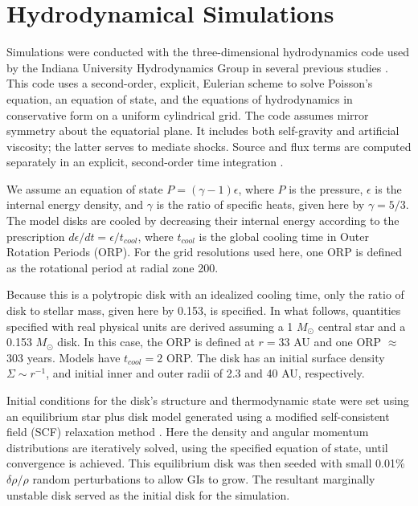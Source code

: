 \documentclass[manuscript]{aastex}
\begin{document}
\section{Hydrodynamical Simulations}

Simulations were conducted with the three-dimensional hydrodynamics code used by the Indiana University Hydrodynamics Group in several previous studies \citep{pickett1998, pickett2000, mejiaphd2004, mejia2005, boley2006, cai2008}.  This code uses a second-order, explicit, Eulerian scheme to solve Poisson's equation, an equation of state, and the equations of hydrodynamics in conservative form on a uniform cylindrical grid.  The code assumes mirror symmetry about the equatorial plane. It includes both self-gravity and artificial viscosity; the latter serves to 
mediate shocks. Source and flux terms \citep{norman1986} are computed separately in an explicit, second-order time integration \citep{albada1982,christodoulou1991,yangphd1992}.

We assume an equation of state $P = (\gamma -1)\epsilon$, where $P$ is the pressure, $\epsilon$ is the internal energy density, and $\gamma$ is the ratio of specific heats, given here by $\gamma = 5/3$.  The model disks are cooled by decreasing their internal energy according to the prescription $d\epsilon/dt = \epsilon / t_{cool}$, where $t_{cool}$ is the global cooling time in Outer Rotation Periods (ORP).  For the grid resolutions used here, one ORP is defined as the rotational period at radial zone 200.


Because this is a polytropic disk with an idealized cooling time, only the ratio of disk to stellar mass, given here by 0.153, is specified.  In what follows, quantities specified with real physical units are derived assuming a 1 $M_\odot$ central star and a 0.153  $M_\odot$ disk. In this case, the ORP is defined at $r = 33$ AU and one ORP $\approx$ 303 years.  Models have $t_{cool} = 2$ ORP. The disk has an initial surface density $\Sigma \sim r^{ -1}$, and initial inner and outer radii of 2.3 and 40 AU, respectively.  

Initial conditions for the disk's structure and thermodynamic state were set using an equilibrium star plus disk model generated using a modified \citet{hachisu1986} self-consistent field (SCF) relaxation method \citep{pickett1996,pickett2003,mejiaphd2004,mejia2005,cai2006}. Here  the density and angular momentum distributions are iteratively solved, using the specified equation of state,  until convergence is achieved. This  equilibrium disk was then seeded with small 0.01\% $\delta\rho/\rho$ random perturbations to allow GIs to grow.  The resultant marginally unstable disk served as the initial disk for the simulation.
\end{document}
